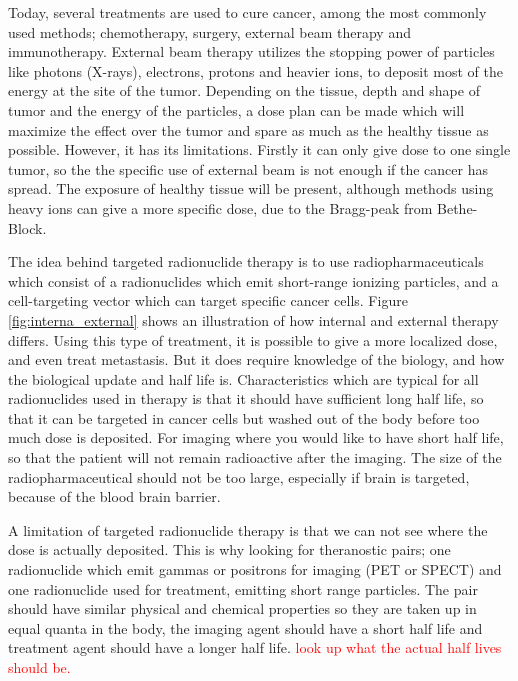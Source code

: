 \documentclass[a4paper,11pt,twoside]{book}
\begin{document}
Today, several treatments are used to cure cancer, among the most commonly used methods; chemotherapy, surgery, external beam therapy and immunotherapy.  External beam therapy utilizes the stopping power of particles like photons (X-rays), electrons, protons and heavier ions, to deposit most of the energy at the site of the tumor. Depending on the tissue, depth and shape of tumor and the energy of the particles, a dose plan can be made which will maximize the effect over the tumor and spare as much as the healthy tissue as possible. However, it has its limitations. Firstly it can only give dose to one single tumor, so the the specific use of external beam is not enough if the cancer has spread. The exposure of healthy tissue will be present, although methods using heavy ions can give a more specific dose, due to the Bragg-peak from Bethe-Block. \newline

\noindent
The idea behind targeted radionuclide therapy is to use radiopharmaceuticals which consist of a radionuclides which emit short-range ionizing particles, and a cell-targeting vector which can target specific cancer cells. Figure \ref{fig:interna_external} shows an illustration of how internal and external therapy differs. Using this type of treatment, it is possible to give a more localized dose, and even treat metastasis. But it does require knowledge of the biology, and how the biological update and half life is. Characteristics which are typical for all radionuclides used in therapy is that it should have sufficient long half life, so that it can be targeted in cancer cells but washed out of the body before too much dose is deposited. For imaging  where you would like to have short half life, so that the patient will not remain radioactive after the imaging. The size of the radiopharmaceutical should not be too large, especially if brain is targeted, because of the blood brain barrier. 

A limitation of targeted radionuclide therapy is that we can not see where the dose is actually deposited. This is why looking for theranostic pairs; one radionuclide which emit gammas or positrons for imaging (PET or SPECT) and one radionuclide used for treatment, emitting short range particles. The pair should have similar physical and chemical properties so they are taken up in equal quanta in the body, the imaging agent should have a short half life and treatment agent should have a longer half life. \textcolor{red}{look up what the actual half lives should be.} 
\end{document}

